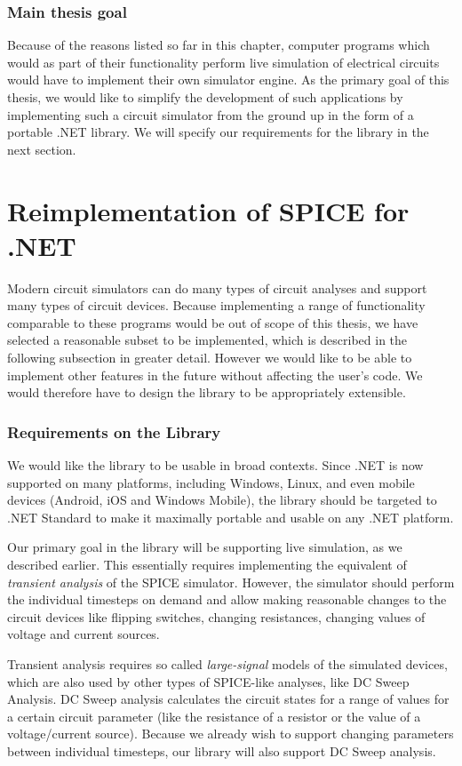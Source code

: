\subsubsection*{Main thesis goal}
Because of the reasons listed so far in this chapter, computer programs which would as part of their functionality perform live simulation of electrical circuits would have to implement their own simulator engine. As the primary goal of this thesis, we would like to simplify the development of such applications by implementing such a circuit simulator from the ground up in the form of a portable .NET library. We will specify our requirements for the library in the next section.

\section{Reimplementation of SPICE for .NET}

Modern circuit simulators can do many types of circuit analyses and support many types of circuit devices. Because implementing a range of functionality comparable to these programs would be out of scope of this thesis, we have selected a reasonable subset to be implemented, which is described in the following subsection in greater detail. However we would like to be able to implement other features in the future without affecting the user's code. We would therefore have to design the library to be appropriately extensible.

\subsubsection*{Requirements on the Library}

We would like the library to be usable in broad contexts. Since .NET is now supported on many platforms, including Windows, Linux, and even mobile devices (Android, iOS and Windows Mobile), the library should be targeted to .NET Standard to make it maximally portable and usable on any .NET platform.

Our primary goal in the library will be supporting live simulation, as we described earlier. This essentially requires implementing the equivalent of \textit{transient analysis} of the SPICE simulator. However, the simulator should perform the individual timesteps on demand and allow making reasonable changes to the circuit devices like flipping switches, changing resistances, changing values of voltage and current sources.

Transient analysis requires so called \textit{large-signal} models of the simulated devices, which are also used by other types of SPICE-like analyses, like DC Sweep Analysis. DC Sweep analysis calculates the circuit states for a range of values for a certain circuit parameter (like the resistance of a resistor or the value of a voltage/current source). Because we already wish to support changing parameters between individual timesteps, our library will also support DC Sweep analysis.

